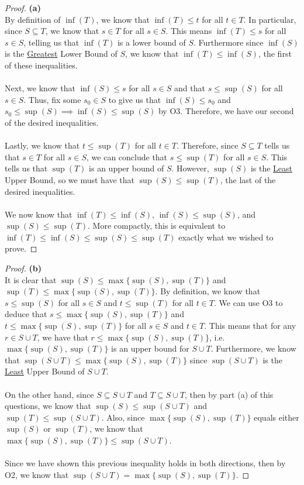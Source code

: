 \documentclass[10pt,a4paper]{article}
\theoremstyle{definition}
\begin{document}
\begin{proof}{\textbf{(a)}}
\\By definition of $\inf(T)$, we know that $\inf(T) \leq t$ for all $t \in T$. In particular, since $S \subseteq T$, we know that $s \in T$ for all $s \in S$. This means $\inf(T) \leq s$ for all $s \in S$, telling us that $\inf(T)$ is a lower bound of $S$. Furthermore since $\inf(S)$ is the \underline{Greatest} Lower Bound of $S$, we know that $\inf(T) \leq \inf(S)$, the first of these inequalities. 
\\
\\Next, we know that $\inf(S) \leq s$ for all $s \in S$ and that $s \leq \sup(S)$ for all $s \in S$. Thus, fix some $s_0 \in S$ to give us that $\inf(S) \leq s_0$ and $s_0 \leq \sup(S) \implies \inf(S) \leq \sup(S)$ by O3. Therefore, we have our second of the desired inequalities. 
\\
\\Lastly, we know that $t \leq \sup(T)$ for all $t \in T$. Therefore, since $S \subseteq T$ tells us that $s \in T$ for all $s \in S$, we can conclude that $s \leq \sup(T)$ for all $s \in S$. This tells us that $\sup(T)$ is an upper bound of $S$. However, $\sup(S)$ is the \underline{Least} Upper Bound, so we must have that $\sup(S) \leq \sup(T)$, the last of the desired inequalities.
\\
\\We now know that $\inf(T) \leq \inf(S)$, $\inf(S) \leq \sup(S)$, and $\sup(S) \leq \sup(T)$. More compactly, this is equivalent to $\inf(T) \leq \inf(S) \leq \sup(S) \leq \sup(T)$ exactly what we wished to prove. 
\end{proof}

\begin{proof}{\textbf{(b)}}
\\It is clear that $\sup(S) \leq \max\{\sup(S), \sup(T)\}$ and $\sup(T) \leq \max\{\sup(S), \sup(T)\}$. By definition, we know that $s \leq \sup(S)$ for all $s \in S$ and $t \leq \sup(T)$ for all $t \in T$. We can use O3 to deduce that $s \leq \max\{\sup(S), \sup(T)\}$ and $t \leq \max\{\sup(S), \sup(T)\}$ for all $s \in S$ and $t \in T$. This means that for any $r \in S \cup T$, we have that $r \leq \max\{\sup(S), \sup(T)\}$, i.e. $\max\{\sup(S), \sup(T)\}$ is an upper bound for $S \cup T$. Furthermore, we know that $\sup(S \cup T) \leq \max\{\sup(S), \sup(T)\}$ since $\sup(S \cup T)$ is the \underline{Least} Upper Bound of $S \cup T$.
\\
\\On the other hand, since $S \subseteq S \cup T$ and $T \subseteq S \cup T$, then by part (a) of this questions, we know that $\sup(S) \leq \sup(S \cup T)$ and $\sup(T) \leq \sup(S \cup T)$. Also, since $\max\{\sup(S), \sup(T)\}$ equals either $\sup(S)$ or $\sup(T)$, we know that $\max\{\sup(S), \sup(T)\} \leq \sup(S \cup T)$.\\
\\Since we have shown this previous inequality holds in both directions, then by O2, we know that $\sup(S \cup T) = \max\{\sup(S), \sup(T)\}$.
\end{proof}
\end{document}
